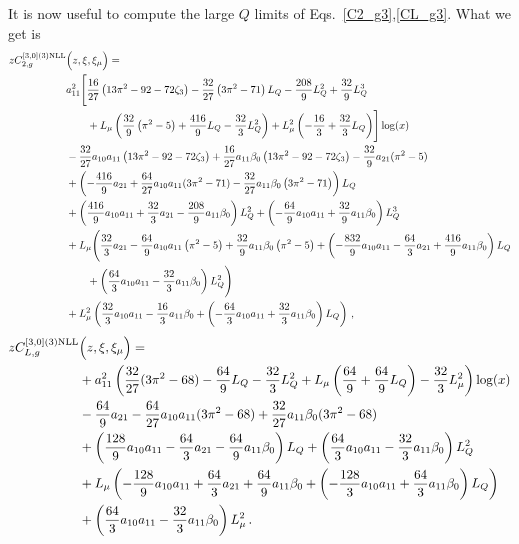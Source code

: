 \documentclass[a4paper]{article}
\begin{document}
\endgroup

It is now useful to compute the large $Q$ limits of Eqs.~\eqref{C2_g3},\eqref{CL_g3}. What we get is
\begingroup
\allowdisplaybreaks
\begin{align}
		z C_{2,g}^{[3, 0](3) \rm NLL}&\Bigl(z,\xi,\xi_\mu\Bigr)= \notag\\
		& a_{11}^2 \Biggl[\frac{16}{27} \left(13 \pi^2 -92- 72 \zeta_3\right) -\frac{32}{27} \left(3 \pi^2 - 71\right) L_Q - \frac{208}{9} L_Q^2 + \frac{32}{9} L_Q^3 \notag \\
		& \qquad + L_\mu \left(\frac{32}{9} \left( \pi^2 - 5\right) + \frac{416}{9} L_Q - \frac{32}{3} L_Q^2 \right) + L_\mu^2 \left(-\frac{16}{3} + \frac{32}{3} L_Q\right)\Biggr] \log(x) \notag\\
		& - \frac{32}{27} a_{10} a_{11} \left(13 \pi^2 -92- 72 \zeta_3\right) + \frac{16}{27} a_{11} \beta_0 \left(13 \pi^2 -92- 72 \zeta_3\right) -\frac{32}{9} a_{21} (\pi^2 - 5)\notag\\
		& + \left(-\frac{416}{9} a_{21} + \frac{64}{27} a_{10} a_{11} (3 \pi^2 - 71) - \frac{32}{27} a_{11} \beta_0 \left(3 \pi^2 - 71\right)\right) L_Q \notag\\
		& + \left( \frac{416}{9} a_{10} a_{11} + \frac{32}{3} a_{21} - \frac{208}{9} a_{11} \beta_0 \right) L_Q^2 + \left(-\frac{64}{9} a_{10} a_{11} + \frac{32}{9} a_{11} \beta_0 \right) L_Q^3 \notag\\
		& + L_\mu \Biggl( \frac{32}{3} a_{21} - \frac{64}{9} a_{10} a_{11} \left(\pi^2 - 5\right) + \frac{32}{9} a_{11} \beta_0 \left( \pi^2 - 5\right) + \left(-\frac{832}{9} a_{10} a_{11} - \frac{64}{3} a_{21} + \frac{416}{9} a_{11} \beta_0 \right)L_Q \notag\\
		& \qquad + \left( \frac{64}{3} a_{10} a_{11} - \frac{32}{3} a_{11} \beta_0\right) L_Q^2\Biggr) \notag\\
		& + L_\mu^2 \left( \frac{32}{3} a_{10} a_{11} - \frac{16}{3} a_{11} \beta_0 + \left(-\frac{64}{3} a_{10} a_{11} + \frac{32}{3} a_{11} \beta_0 \right) L_Q \right)\,,
\end{align}
\endgroup
\begingroup
\allowdisplaybreaks
\begin{align}
		z C_{L,g}^{[3, 0](3) \rm NLL}&\Bigl(z,\xi,\xi_\mu\Bigr)= \notag\\
		& + a_{11}^2 \left(\frac{32}{27} (3 \pi^2 - 68) - \frac{64}{9} L_Q - \frac{32}{3} L_Q^2 + L_\mu \left(\frac{64}{9} + \frac{64}{9} L_Q\right)- \frac{32}{3} L_\mu^2\right) \log(x) \notag\\
		& -\frac{64}{9} a_{21} - \frac{64}{27} a_{10} a_{11} (3 \pi^2 - 68) +  \frac{32}{27} a_{11} \beta_0 (3 \pi^2 - 68)\notag \\
		&  + \left(\frac{128}{9} a_{10} a_{11} - \frac{64}{3} a_{21} - \frac{64}{9} a_{11} \beta_0\right) L_Q + \left(\frac{64}{3} a_{10} a_{11} - \frac{32}{3} a_{11} \beta_0\right) L_Q^2\notag\\
		& + L_\mu \left(-\frac{128}{9} a_{10} a_{11} + \frac{64}{3} a_{21} + \frac{64}{9} a_{11} \beta_0 +\left(- \frac{128}{3} a_{10} a_{11} + \frac{64}{3} a_{11} \beta_0 \right)L_Q\right) \notag\\
		& + \left(\frac{64}{3} a_{10} a_{11} - \frac{32}{3} a_{11} \beta_0\right) L_\mu^2\,.
	\end{align}
\end{document}
